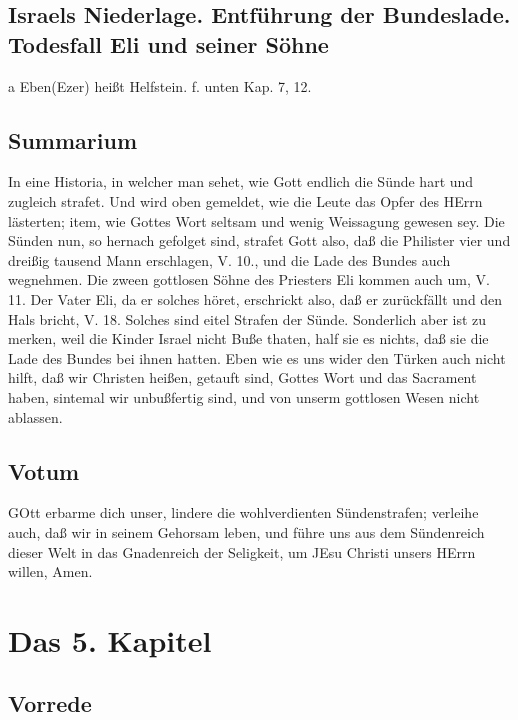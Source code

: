 \section[Israels Niederlage. Entführung der Bundeslade. Todesfall Eli und]{Israels Niederlage. Entführung der Bundeslade. Todesfall Eli und seiner Söhne}

a Eben(Ezer) heißt Helfstein. f. unten Kap. 7, 12.

\section{Summarium}

In eine Historia, in welcher man sehet, wie Gott endlich die Sünde hart und zugleich strafet. Und wird oben gemeldet, wie die Leute das Opfer des HErrn lästerten; item, wie Gottes Wort seltsam und wenig Weissagung gewesen sey. Die Sünden nun, so hernach gefolget sind, strafet Gott also, daß die Philister vier und dreißig tausend Mann erschlagen, V. 10., und die Lade des Bundes auch wegnehmen. Die zween gottlosen Söhne des Priesters Eli kommen auch um, V. 11. Der Vater Eli, da er solches höret, erschrickt also, daß er zurückfällt und den Hals bricht, V. 18. Solches sind eitel Strafen der Sünde. Sonderlich aber ist zu merken, weil die Kinder Israel nicht Buße thaten, half sie es nichts, daß sie die Lade des Bundes bei ihnen hatten. Eben wie es uns wider den Türken auch nicht hilft, daß wir Christen heißen, getauft sind, Gottes Wort und das Sacrament haben, sintemal wir unbußfertig sind, und von unserm gottlosen Wesen nicht ablassen.

\section{Votum}

GOtt erbarme dich unser, lindere die wohlverdienten Sündenstrafen; verleihe auch, daß wir in seinem Gehorsam leben, und führe uns aus dem Sündenreich dieser Welt in das Gnadenreich der Seligkeit, um JEsu Christi unsers HErrn willen, Amen.

\chapter{Das 5. Kapitel}

\section{Vorrede}

